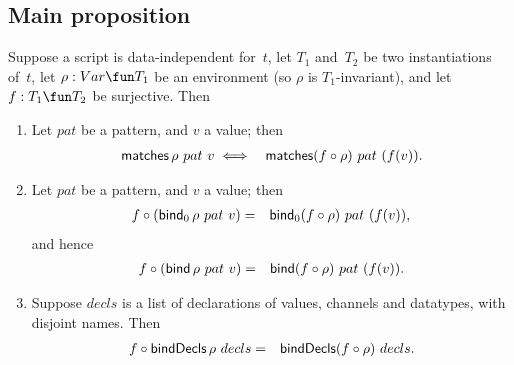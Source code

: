 


\subsection{Main proposition}

\begin{prop}
\label{prop:expressions-1}
Suppose a script is data-independent for~$t$, let $T_1$ and~$T_2$ be two
instantiations of~$t$, let $\rho: Var \fun T_1$ be an environment (so $\rho$
is $T_1$-invariant), and let $f
: T_1 \fun T_2$ be surjective.  
Then
\begin{enumerate}
\item\label{item:matches} Let $pat$ be a pattern, and $v$ a value; then
\begin{eqnarray*}
  \mathop{\sf matches} \rho~ pat~v & \iff & \mathop{\sf matches} (f\circ\rho) ~ pat~(f(v)).
\end{eqnarray*}

\item\label{item:bind}
Let $pat$ be a pattern, and $v$ a value; then
\begin{eqnarray*}
f \circ (\mathop{\sf bind}\nolimits_0 \rho~pat~v) &  = & \mathop{\sf bind}\nolimits_0 (f\circ\rho)~pat~(f(v)),
\end{eqnarray*}
and hence
\begin{eqnarray*}
f \circ (\mathop{\sf bind}\nolimits \rho~pat~v) & = & \mathop{\sf bind}\nolimits (f\circ\rho)~pat~(f(v)).
\end{eqnarray*}

\item\label{item:bindDecls} Suppose $decls$ is a list of declarations of
  values, channels and datatypes, with disjoint names.  Then
  \begin{eqnarray*}
  f \circ \mathop{\sf bindDecls} \rho~decls & = & \mathop{\sf bindDecls} (f \circ \rho)~decls.
  \end{eqnarray*}




\end{enumerate}
\end{prop}
